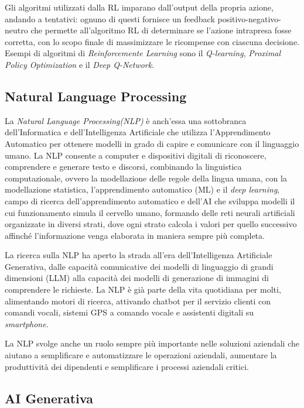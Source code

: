 Gli algoritmi utilizzati dalla RL imparano dall'output della propria azione, andando a tentativi: ognuno di questi fornisce un feedback positivo-negativo-neutro che permette all'algoritmo RL di determinare se l'azione intrapresa fosse corretta, con lo scopo finale di massimizzare le ricompense con ciascuna decisione.
Esempi di algoritmi di \textit{Reinforcemente Learning} sono il \textit{Q-learning}, \textit{Proximal Policy Optimization} e il \textit{Deep Q-Network}.


\subsection{Natural Language Processing}

La \textit{Natural Language Processing(NLP)} è anch'essa una sottobranca dell'Informatica e dell'Intelligenza Artificiale che utilizza l'Apprendimento Automatico per ottenere modelli in grado di capire e comunicare con il linguaggio umano.
La NLP consente a computer e dispositivi digitali di riconoscere, comprendere e generare testo e discorsi, combinando la linguistica computazionale, ovvero la modellazione delle regole della lingua umana, con la modellazione statistica, l'apprendimento automatico (ML) e il \textit{deep learning}, campo di ricerca dell'apprendimento automatico e dell'AI che sviluppa modelli il cui funzionamento simula il cervello umano, formando delle reti neurali artificiali organizzate in diversi strati, dove ogni strato calcola i valori per quello successivo affinché l'informazione venga elaborata in maniera sempre più completa.

La ricerca sulla NLP ha aperto la strada all'era dell'Intelligenza Artificiale Generativa, dalle capacità comunicative dei modelli di linguaggio di grandi dimensioni (LLM) alla capacità dei modelli di generazione di immagini di comprendere le richieste. La NLP è già parte della vita quotidiana per molti, alimentando motori di ricerca, attivando chatbot per il servizio clienti con comandi vocali, sistemi GPS a comando vocale e assistenti digitali su \textit{smartphone}.

La NLP svolge anche un ruolo sempre più importante nelle soluzioni aziendali che aiutano a semplificare e automatizzare le operazioni aziendali, aumentare la produttività dei dipendenti e semplificare i processi aziendali critici.


\subsection{AI Generativa}

